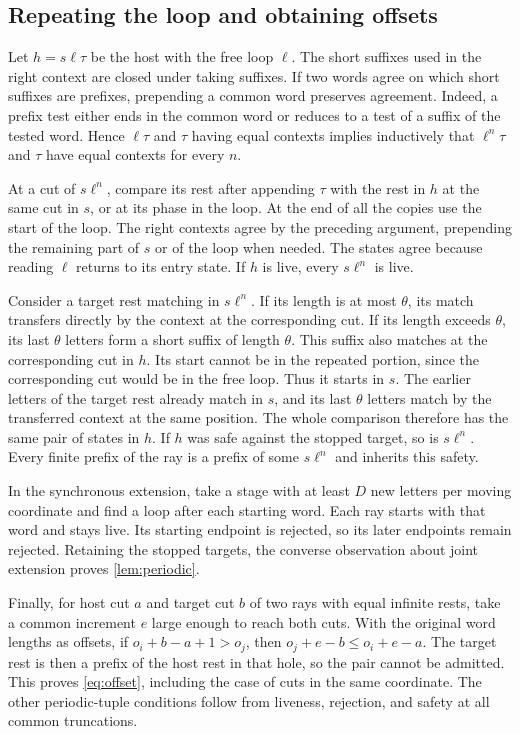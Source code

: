 \subsection{Repeating the loop and obtaining offsets}

Let $h=s\ell\tau$ be the host with the free loop $\ell$. The short suffixes
used in the right context are closed under taking suffixes.
If two words agree on which short suffixes are prefixes, prepending
a common word preserves agreement. Indeed, a prefix test either
ends in the common word or reduces to a test of a suffix of the tested
word. Hence $\ell\tau$ and $\tau$ having equal contexts implies inductively
that $\ell^n\tau$ and $\tau$ have equal contexts for every $n$.

At a cut of $s\ell^n$, compare its rest after appending $\tau$ with
the rest in $h$ at the same cut in $s$, or at its phase in
the loop. At the end of all the copies use the start of the loop.
The right contexts agree by the preceding argument, prepending
the remaining part of $s$ or of the loop when needed. The states
agree because reading $\ell$ returns to its entry state.
If $h$ is live, every $s\ell^n$ is live.

Consider a target rest matching in $s\ell^n$. If its length is at most
$\theta$, its match transfers directly by the context at the corresponding
cut. If its length exceeds $\theta$, its last $\theta$ letters form a short
suffix of length $\theta$. This suffix also matches at the corresponding
cut in $h$. Its start cannot be in the repeated portion, since the
corresponding cut would be in the free loop. Thus it starts in
$s$. The earlier letters of the target rest already match in
$s$, and its last $\theta$ letters match by the transferred
context at the same position. The whole comparison therefore has
the same pair of states in $h$. If $h$ was safe against the stopped
target, so is $s\ell^n$. Every finite prefix of the ray is a prefix
of some $s\ell^n$ and inherits this safety.

In the synchronous extension, take a stage with at least $D$ new letters
per moving coordinate and find a loop after each starting word.
Each ray starts with that word and stays live. Its starting endpoint
is rejected, so its later endpoints remain rejected. Retaining the
stopped targets, the converse observation about joint extension
proves \cref{lem:periodic}.

Finally, for host cut $a$ and target cut $b$ of two rays with
equal infinite rests, take a common increment $e$ large enough to
reach both cuts. With the original word lengths as offsets,
if $o_i+b-a+1>o_j$, then
$o_j+e-b\le o_i+e-a$. The target rest is then a
prefix of the host rest in that hole, so the pair cannot be admitted.
This proves \eqref{eq:offset}, including the case of cuts in the
same coordinate. The other periodic-tuple conditions follow from
liveness, rejection, and safety at all common truncations.
